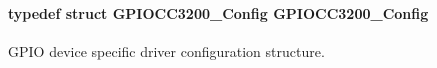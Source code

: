 \paragraph[{G\+P\+I\+O\+C\+C3200\+\_\+\+Config}]{\setlength{\rightskip}{0pt plus 5cm}typedef struct {\bf G\+P\+I\+O\+C\+C3200\+\_\+\+Config}  {\bf G\+P\+I\+O\+C\+C3200\+\_\+\+Config}}\label{_g_p_i_o_c_c3200_8h_a83397cd7214bc18a324928587f638415}


G\+P\+I\+O device specific driver configuration structure. 

